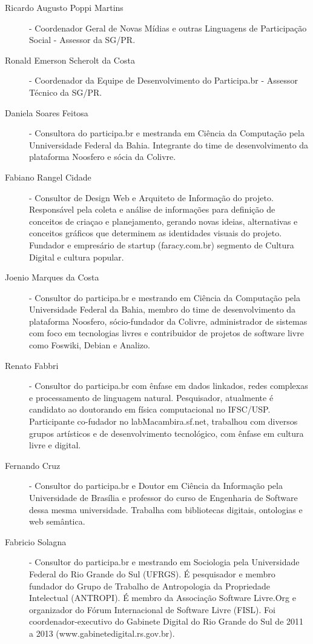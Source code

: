 \documentclass{article}
\begin{document}
\begin{description}

  \item [Ricardo Augusto Poppi Martins]
  - Coordenador Geral de Novas Mídias e outras Linguagens de Participação Social - Assessor da SG/PR.

  \item [Ronald Emerson Scherolt da Costa]
  - Coordenador da Equipe de Desenvolvimento do Participa.br - Assessor Técnico da SG/PR.

  \item [Daniela Soares Feitosa]
  - Consultora do participa.br e mestranda em Ciência da Computação pela Unniversidade Federal da Bahia. Integrante do time de desenvolvimento da plataforma Noosfero e sócia da Colivre.

  \item [Fabiano Rangel Cidade]
  - Consultor de Design Web e Arquiteto de Informação do projeto. Responsável pela coleta e análise de informações para definição de conceitos de criaçao e planejamento, gerando novas ideias, alternativas e conceitos gráficos que determinem as identidades visuais do projeto. Fundador e empresário de startup (faracy.com.br) segmento de Cultura Digital e cultura popular.

  \item [Joenio Marques da Costa]
  - Consultor do participa.br e mestrando em Ciência da Computação pela Universidade Federal da Bahia, membro do time de desenvolvimento da plataforma Noosfero, sócio-fundador da Colivre, administrador de sistemas com foco em tecnologias livres e contribuidor de projetos de software livre como Foswiki, Debian e Analizo.

  \item [Renato Fabbri]
  - Consultor do participa.br com ênfase em dados linkados, redes complexas e processamento de linguagem natural. Pesquisador, atualmente é candidato ao doutorando em física computacional no IFSC/USP. Participante co-fudador no labMacambira.sf.net, trabalhou com diversos grupos artísticos e de desenvolvimento tecnológico, com ênfase em cultura livre e digital.

  \item [Fernando Cruz]
  - Consultor do participa.br e Doutor em Ciência da Informação pela Universidade de Brasília e professor do curso de Engenharia de Software dessa mesma universidade. Trabalha com bibliotecas digitais, ontologias e web semântica.

  \item [Fabricio Solagna]
  - Consultor do participa.br e mestrando em Sociologia pela Universidade Federal do Rio Grande do Sul (UFRGS). É pesquisador e membro fundador do Grupo de Trabalho de Antropologia da Propriedade Intelectual (ANTROPI). É membro da Associação Software Livre.Org e organizador do Fórum Internacional de Software Livre (FISL). Foi coordenador-executivo do Gabinete Digital do Rio Grande do Sul de 2011 a 2013 (www.gabinetedigital.rs.gov.br). 


\end{description}
\end{document}
